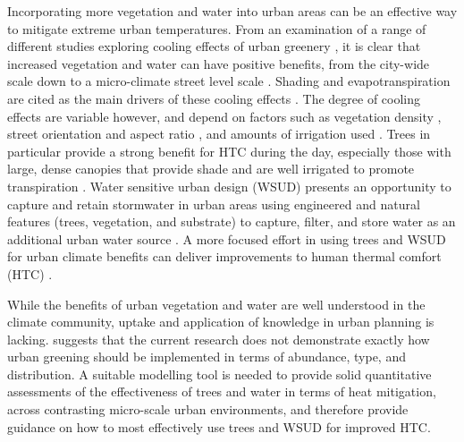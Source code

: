 \documentclass[final,3p,times,authoryear]{elsarticle}
\begin{document}
Incorporating more vegetation and water into urban areas can be an effective way to mitigate extreme urban temperatures. From an examination of a range of different studies exploring cooling effects of urban greenery \citep{Tsiros2010,Shashua-Bar2010a,Spangenberg2008}, it is clear that increased vegetation and water can have positive benefits, from the city-wide scale down to a micro-climate street level scale \citep{Coutts2012}. Shading and evapotranspiration are cited as the main drivers of these cooling effects \citep{Bowler2010}. The degree of cooling effects are variable however, and depend on factors such as vegetation density \citep{Hall2016,Bodnaruk2017}, street orientation and aspect ratio \citep{Thorsson2011,Ali-Toudert2006b}, and amounts of irrigation used \citep{Jenerette2011}. Trees in particular provide a strong benefit for HTC during the day, especially those with large, dense canopies that provide shade and are well irrigated to promote transpiration \citep{Coutts2015,Huang2008,Ylmaz2007,Shashua-Bar2000}. Water sensitive urban design (WSUD) presents an opportunity to capture and retain stormwater in urban areas using engineered and natural features (trees, vegetation, and substrate) to capture, filter, and store water as an additional urban water source \citep{Wong2009}. A more focused effort in using trees and WSUD for urban climate benefits can deliver improvements to human thermal comfort (HTC) \citep{Coutts2012}. 


While the benefits of urban vegetation and water are well understood in the climate community, uptake and application of knowledge in urban planning is lacking. \cite{Bowler2010} suggests that the current research does not demonstrate exactly how urban greening should be implemented in terms of abundance, type, and distribution.  A suitable modelling tool is needed to provide solid quantitative assessments of the effectiveness of trees and water in terms of heat mitigation, across contrasting micro-scale urban environments, and therefore provide guidance on how to most effectively use trees and WSUD for improved HTC. 
\end{document}

